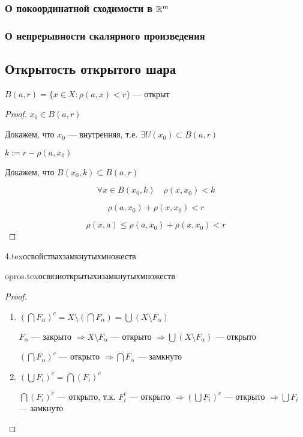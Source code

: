 \subsubsection{О покоординатной сходимости в $\mathbb{R}^m$}

\subsubsection{О непрерывности скалярного произведения}

\subsection{Открытость открытого шара}
$B(a,r)=\{x\in X : \rho(a,x)<r\}$ --- открыт
\begin{proof}
    $x_0\in B(a, r)$

    Докажем, что $x_0$ --- внутренняя, т.е. $\exists U(x_0)\subset B(a, r)$

    $k:=r-\rho(a, x_0)$

    Докажем, что $B(x_0, k)\subset B(a, r)$

    $$\forall x\in B(x_0, k) \quad \rho(x, x_0)<k$$
    
    $$\rho(a, x_0) + \rho(x, x_0)<r$$

    $$\rho(x, a) \leq \rho(a, x_0) + \rho(x, x_0)<r$$
\end{proof}

{4.tex}{освойствахзамкнутыхмножеств}

{opros.tex}{освязиоткрытыхизамкнутыхмножеств}
\begin{proof}
    \begin{enumerate}
        \item $(\bigcap F_\alpha)^c=X\setminus(\bigcap F_\alpha)=\bigcup (X\setminus F_\alpha)$
        
        $F_\alpha$ --- закрыто $\Rightarrow X\setminus F_\alpha$ --- открыто $\Rightarrow \bigcup (X\setminus F_\alpha)$ --- открыто

        $(\bigcap F_\alpha)^c$ --- открыто $\Rightarrow \bigcap F_\alpha$ --- замкнуто

        \item $(\bigcup F_i)^c=\bigcap(F_i)^c$
        
        $\bigcap(F_i)^c$ --- открыто, т.к. $F_i^c$ --- открыто $\Rightarrow (\bigcup F_i)^c$ --- открыто $\Rightarrow \bigcup F_i$ --- замкнуто
    \end{enumerate}
\end{proof}


